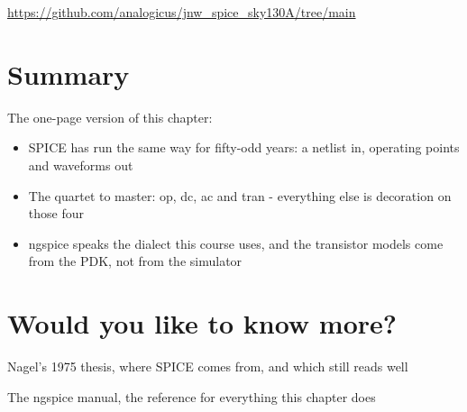 \url{https://github.com/analogicus/jnw_spice_sky130A/tree/main}

\section{Summary}\label{summary}

The one-page version of this chapter:

\begin{itemize}
\tightlist
\item
  SPICE has run the same way for fifty-odd years: a netlist in,
  operating points and waveforms out
\item
  The quartet to master: op, dc, ac and tran - everything else is
  decoration on those four
\item
  ngspice speaks the dialect this course uses, and the transistor models
  come from the PDK, not from the simulator
\end{itemize}

\section{Would you like to know
more?}\label{would-you-like-to-know-more}

Nagel's 1975 thesis, where SPICE comes from, and which still reads well

The ngspice manual, the reference for everything this chapter does
